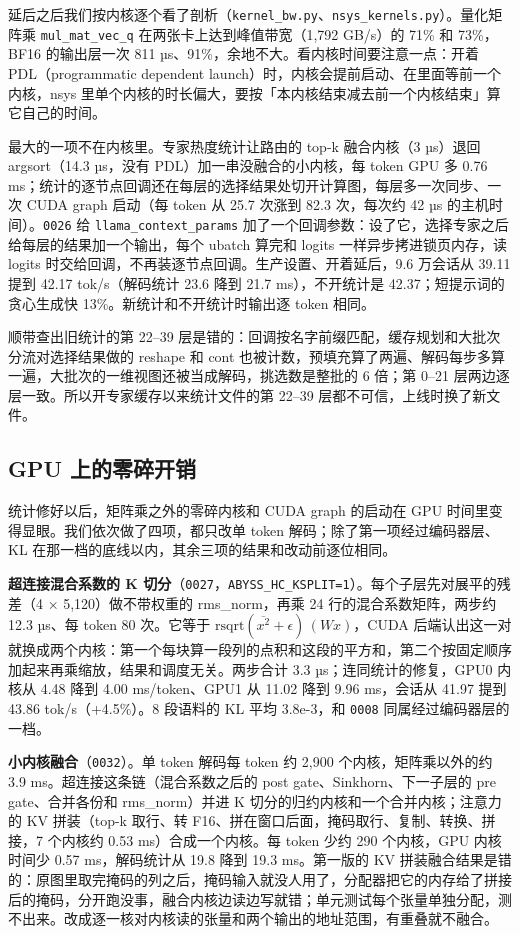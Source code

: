 \documentclass[11pt,a4paper]{article}
\newcommand{\code}[1]{\texttt{#1}}
\newcommand{\tps}{tok/s}
\begin{document}
延后之后我们按内核逐个看了剖析（\code{kernel\_bw.py}、\code{nsys\_kernels.py}）。量化矩阵乘 \code{mul\_mat\_vec\_q} 在两张卡上达到峰值带宽（1,792 GB/s）的 71\% 和 73\%，BF16 的输出层一次 811 µs、91\%，余地不大。看内核时间要注意一点：开着 PDL（programmatic dependent launch）时，内核会提前启动、在里面等前一个内核，nsys 里单个内核的时长偏大，要按「本内核结束减去前一个内核结束」算它自己的时间。

最大的一项不在内核里。专家热度统计让路由的 top-k 融合内核（3 µs）退回 argsort（14.3 µs，没有 PDL）加一串没融合的小内核，每 token GPU 多 0.76 ms；统计的逐节点回调还在每层的选择结果处切开计算图，每层多一次同步、一次 CUDA graph 启动（每 token 从 25.7 次涨到 82.3 次，每次约 42 µs 的主机时间）。\code{0026} 给 \code{llama\_context\_params} 加了一个回调参数：设了它，选择专家之后给每层的结果加一个输出，每个 ubatch 算完和 logits 一样异步拷进锁页内存，读 logits 时交给回调，不再装逐节点回调。生产设置、开着延后，9.6 万会话从 39.11 提到 42.17 \tps{}（解码统计 23.6 降到 21.7 ms），不开统计是 42.37；短提示词的贪心生成快 13\%。新统计和不开统计时输出逐 token 相同。

顺带查出旧统计的第 22--39 层是错的：回调按名字前缀匹配，缓存规划和大批次分流对选择结果做的 reshape 和 cont 也被计数，预填充算了两遍、解码每步多算一遍，大批次的一维视图还被当成解码，挑选数是整批的 6 倍；第 0--21 层两边逐层一致。所以开专家缓存以来统计文件的第 22--39 层都不可信，上线时换了新文件。

\subsection{GPU 上的零碎开销}
\label{sec:kernels}

统计修好以后，矩阵乘之外的零碎内核和 CUDA graph 的启动在 GPU 时间里变得显眼。我们依次做了四项，都只改单 token 解码；除了第一项经过编码器层、KL 在那一档的底线以内，其余三项的结果和改动前逐位相同。

\textbf{超连接混合系数的 K 切分}（\code{0027}，\code{ABYSS\_HC\_KSPLIT=1}）。每个子层先对展平的残差（4 × 5,120）做不带权重的 rms\_norm，再乘 24 行的混合系数矩阵，两步约 12.3 µs、每 token 80 次。它等于 $\mathrm{rsqrt}(\overline{x^2}+\epsilon)\,(Wx)$，CUDA 后端认出这一对就换成两个内核：第一个每块算一段列的点积和这段的平方和，第二个按固定顺序加起来再乘缩放，结果和调度无关。两步合计 3.3 µs；连同统计的修复，GPU0 内核从 4.48 降到 4.00 ms/token、GPU1 从 11.02 降到 9.96 ms，会话从 41.97 提到 43.86 \tps{}（+4.5\%）。8 段语料的 KL 平均 3.8e-3，和 \code{0008} 同属经过编码器层的一档。

\textbf{小内核融合}（\code{0032}）。单 token 解码每 token 约 2,900 个内核，矩阵乘以外的约 3.9 ms。超连接这条链（混合系数之后的 post gate、Sinkhorn、下一子层的 pre gate、合并各份和 rms\_norm）并进 K 切分的归约内核和一个合并内核；注意力的 KV 拼装（top-k 取行、转 F16、拼在窗口后面，掩码取行、复制、转换、拼接，7 个内核约 0.53 ms）合成一个内核。每 token 少约 290 个内核，GPU 内核时间少 0.57 ms，解码统计从 19.8 降到 19.3 ms。第一版的 KV 拼装融合结果是错的：原图里取完掩码的列之后，掩码输入就没人用了，分配器把它的内存给了拼接后的掩码，分开跑没事，融合内核边读边写就错；单元测试每个张量单独分配，测不出来。改成逐一核对内核读的张量和两个输出的地址范围，有重叠就不融合。
\end{document}
